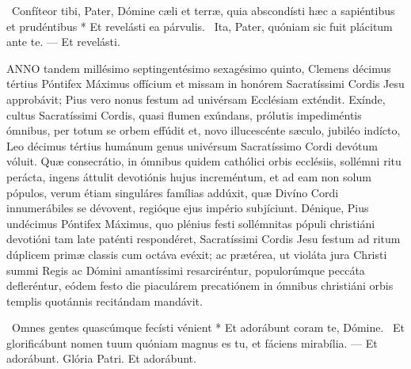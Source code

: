 \R\ Confíteor tibi, Pater, Dómine cæli et terræ, quia abscondísti hæc a sapiéntibus et prudéntibus * Et revelásti ea párvulis. \V\ Ita, Pater, quóniam sic fuit plácitum ante te. --- Et revelásti.


\lettrine[lines=2]{A}{NNO} tandem millésimo septingentésimo sexagésimo quinto, Clemens décimus tértius Póntifex Máximus offícium et missam in honórem Sacratíssimi Cordis Jesu approbávit; Pius vero nonus festum ad univérsam Ecclésiam exténdit. Exínde, cultus Sacratíssimi Cordis, quasi flumen exúndans, prólutis impediméntis ómnibus, per totum se orbem effúdit et, novo illucescénte sæculo, jubiléo indícto, Leo décimus tértius humánum genus univérsum Sacratíssimo Cordi devótum vóluit. Quæ consecrátio, in ómnibus quidem cathólici orbis ecclésiis, sollémni ritu perácta, ingens áttulit devotiónis hujus increméntum, et ad eam non solum pópulos, verum étiam singuláres famílias addúxit, quæ Divíno Cordi innumerábiles se dévovent, regióque ejus império subjíciunt. Dénique, Pius undécimus Póntifex Máximus, quo plénius festi sollémnitas pópuli christiáni devotióni tam late paténti respondéret, Sacratíssimi Cordis Jesu festum ad ritum dúplicem primæ classis cum octáva evéxit; ac prætérea, ut violáta jura Christi summi Regis ac Dómini amantíssimi resarciréntur, populorúmque peccáta defleréntur, eódem festo die piaculárem precatiónem in ómnibus christiáni orbis templis quotánnis recitándam mandávit.

\R\ Omnes gentes quascúmque fecísti vénient * Et adorábunt coram te, Dómine. \V\ Et glorificábunt nomen tuum quóniam magnus es tu, et fáciens mirabília. --- Et adorábunt. Glória Patri. Et adorábunt.


